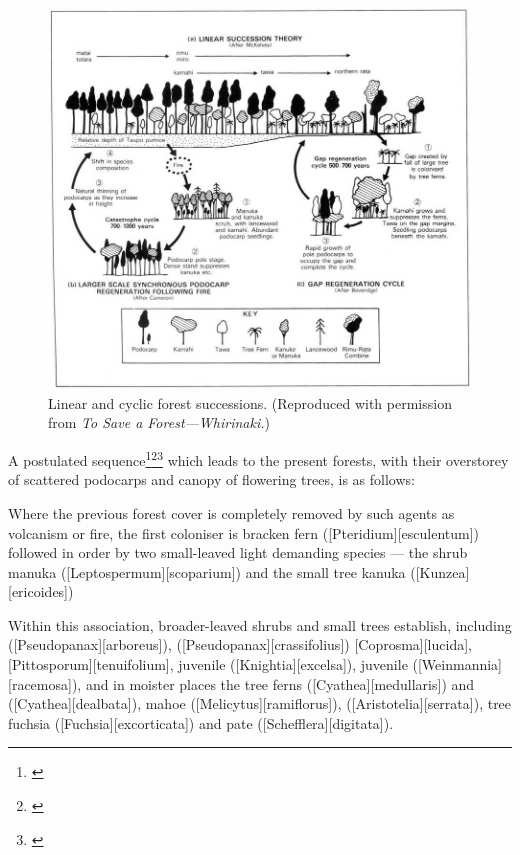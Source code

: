 \begin{figure}[htb]
	\centering
	\includegraphics[width=\textwidth]{graphics/figure64forestsuccession.jpg}
	\caption[Linear and cyclic forest successions]{Linear and cyclic forest successions. (Reproduced with permission from \emph{To Save a Forest---Whirinaki.})}%
	\label{fig:64forestsuccession}
\end{figure}

A postulated sequence\footnote{\cite{cockayne1928vegetation}}\footnote{\cite{mckelvey1963synecology}}\footnote{\cite{mckelvey1973pattern}} which leads to the present forests, with their overstorey of scattered podocarps and canopy of flowering trees, is as follows:

Where the previous forest cover is completely removed by such agents as volcanism or fire, the first coloniser is bracken fern ([Pteridium][esculentum]) followed in order by two small-leaved light demanding species --- the shrub manuka ([Leptospermum][scoparium]) and the small tree kanuka ([Kunzea][ericoides])

Within this association, broader-leaved shrubs and small trees establish, including  ([Pseudopanax][arboreus]),  ([Pseudopanax][crassifolius]) [Coprosma][lucida], [Pittosporum][tenuifolium], juvenile  ([Knightia][excelsa]), juvenile  ([Weinmannia][racemosa]), and in moister places the tree ferns  ([Cyathea][medullaris]) and  ([Cyathea][dealbata]), mahoe ([Melicytus][ramiflorus]),  ([Aristotelia][serrata]), tree fuchsia ([Fuchsia][excorticata]) and pate ([Schefflera][digitata]).

